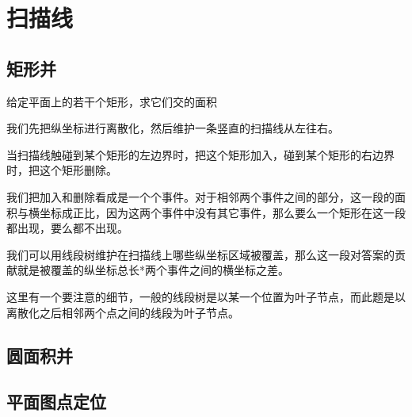 \section{扫描线}

\subsection{矩形并}

\begin{frame}{给定平面上的若干个矩形，求它们交的面积}

我们先把纵坐标进行离散化，然后维护一条竖直的扫描线从左往右。

当扫描线触碰到某个矩形的左边界时，把这个矩形加入，碰到某个矩形的右边界时，把这个矩形删除。

我们把加入和删除看成是一个个事件。对于相邻两个事件之间的部分，这一段的面积与横坐标成正比，因为这两个事件中没有其它事件，那么要么一个矩形在这一段都出现，要么都不出现。

我们可以用线段树维护在扫描线上哪些纵坐标区域被覆盖，那么这一段对答案的贡献就是被覆盖的纵坐标总长*两个事件之间的横坐标之差。

这里有一个要注意的细节，一般的线段树是以某一个位置为叶子节点，而此题是以离散化之后相邻两个点之间的线段为叶子节点。
\end{frame}

\subsection{圆面积并}

\subsection{平面图点定位}